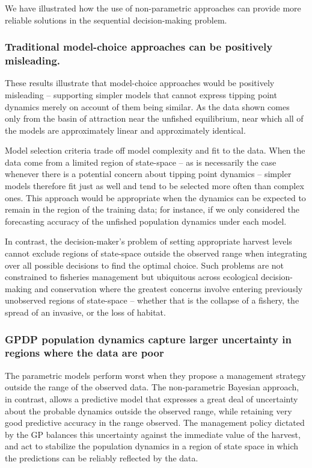 \documentclass[author-year, 12pt,review]{components/elsarticle} %
\begin{document}
We have illustrated how the use of non-parametric approaches can provide
more reliable solutions in the sequential decision-making problem.

\subsubsection{Traditional model-choice approaches can be positively
misleading.}\label{traditional-model-choice-approaches-can-be-positively-misleading.}

These results illustrate that model-choice approaches would be
positively misleading -- supporting simpler models that cannot express
tipping point dynamics merely on account of them being similar. As the
data shown comes only from the basin of attraction near the unfished
equilibrium, near which all of the models are approximately linear and
approximately identical.

Model selection criteria trade off model complexity and fit to the data.
When the data come from a limited region of state-space -- as is
necessarily the case whenever there is a potential concern about tipping
point dynamics -- simpler models therefore fit just as well and tend to
be selected more often than complex ones. This approach would be
appropriate when the dynamics can be expected to remain in the region of
the training data; for instance, if we only considered the forecasting
accuracy of the unfished population dynamics under each model.

In contrast, the decision-maker's problem of setting appropriate harvest
levels cannot exclude regions of state-space outside the observed range
when integrating over all possible decisions to find the optimal choice.
Such problems are not constrained to fisheries management but ubiquitous
across ecological decision-making and conservation where the greatest
concerns involve entering previously unobserved regions of state-space
-- whether that is the collapse of a fishery, the spread of an invasive,
or the loss of habitat.

\subsubsection{GPDP population dynamics capture larger uncertainty in
regions where the data are
poor}\label{gpdp-population-dynamics-capture-larger-uncertainty-in-regions-where-the-data-are-poor}

The parametric models perform worst when they propose a management
strategy outside the range of the observed data. The non-parametric
Bayesian approach, in contrast, allows a predictive model that expresses
a great deal of uncertainty about the probable dynamics outside the
observed range, while retaining very good predictive accuracy in the
range observed. The management policy dictated by the GP balances this
uncertainty against the immediate value of the harvest, and act to
stabilize the population dynamics in a region of state space in which
the predictions can be reliably reflected by the data.
\end{document}
